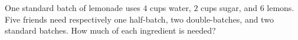 One standard batch of lemonade uses $4$ cups water, $2$ cups sugar, and $6$ lemons. Five friends need respectively one half-batch, two double-batches, and two standard batches. How much of each ingredient is needed?
